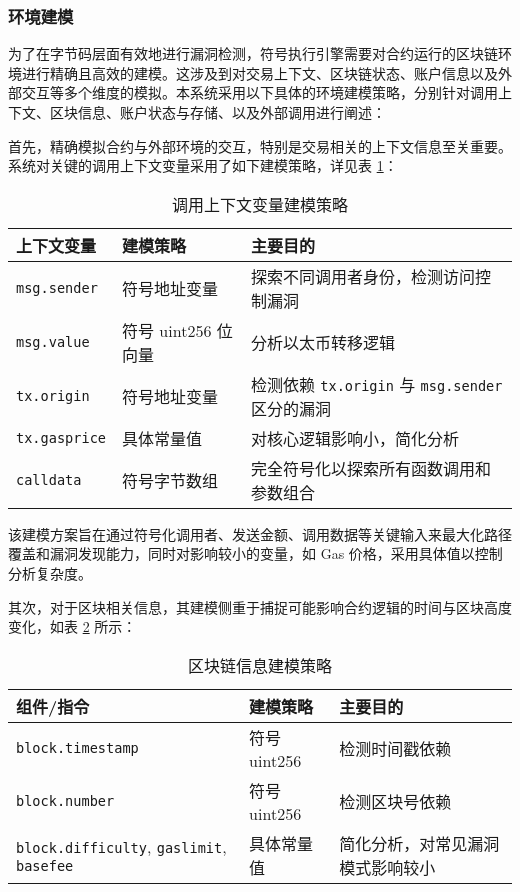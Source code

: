 \documentclass[print, master, vlined, timesmath]{DissertUESTC}
\begin{document}


\subsubsection{环境建模}
为了在字节码层面有效地进行漏洞检测，符号执行引擎需要对合约运行的区块链环境进行精确且高效的建模。这涉及到对交易上下文、区块链状态、账户信息以及外部交互等多个维度的模拟。本系统采用以下具体的环境建模策略，分别针对调用上下文、区块信息、账户状态与存储、以及外部调用进行阐述：

首先，精确模拟合约与外部环境的交互，特别是交易相关的上下文信息至关重要。系统对关键的调用上下文变量采用了如下建模策略，详见表 \ref{tab:call_context_modeling}：

\begin{table}[H] %
    \centering
    \caption{调用上下文变量建模策略}
    \label{tab:call_context_modeling}
    \begin{tabular}{lll}
        \toprule
        \textbf{上下文变量} & \textbf{建模策略} & \textbf{主要目的} \\
        \midrule
        \texttt{msg.sender} & 符号地址变量 & 探索不同调用者身份，检测访问控制漏洞 \\
        \texttt{msg.value} & 符号 uint256 位向量 & 分析以太币转移逻辑 \\
        \texttt{tx.origin} & 符号地址变量  & 检测依赖 \texttt{tx.origin} 与 \texttt{msg.sender} 区分的漏洞 \\
        \texttt{tx.gasprice} & 具体常量值 & 对核心逻辑影响小，简化分析 \\
        \texttt{calldata} & 符号字节数组 & 完全符号化以探索所有函数调用和参数组合 \\
        \bottomrule
    \end{tabular}
\end{table}

该建模方案旨在通过符号化调用者、发送金额、调用数据等关键输入来最大化路径覆盖和漏洞发现能力，同时对影响较小的变量，如 Gas 价格，采用具体值以控制分析复杂度。

其次，对于区块相关信息，其建模侧重于捕捉可能影响合约逻辑的时间与区块高度变化，如表 \ref{tab:block_info_modeling} 所示：

\begin{table}[H] %
    \centering
    \caption{区块链信息建模策略}
    \begin{tabularx}{\linewidth}{ll >{\RaggedRight}X}
        \toprule
        \textbf{组件/指令} & \textbf{建模策略} & \textbf{主要目的} \\
        \midrule
        \texttt{block.timestamp} & 符号 uint256 & 检测时间戳依赖 \\
        \texttt{block.number} & 符号 uint256 & 检测区块号依赖 \\
        \texttt{block.difficulty}, \texttt{gaslimit}, \texttt{basefee} & 具体常量值 & 简化分析，对常见漏洞模式影响较小 \\
        \bottomrule
    \end{tabularx}
    \label{tab:block_info_modeling}
\end{table}
\end{document}

